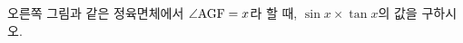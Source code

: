 \noindent\begin{minipage}[t]{0.58\linewidth}\vspace{0pt}\raggedright 오른쪽 그림과 같은 정육면체에서 $\angle\mathrm{AGF}=x$라 할 때, $\sin x\times\tan x$의 값을 구하시오.\end{minipage}\hfill\begin{minipage}[t]{0.4\linewidth}\vspace{0pt}\centering \resizebox{\ifdim\width>\linewidth\linewidth\else\width\fi}{!}{}\end{minipage}\par
